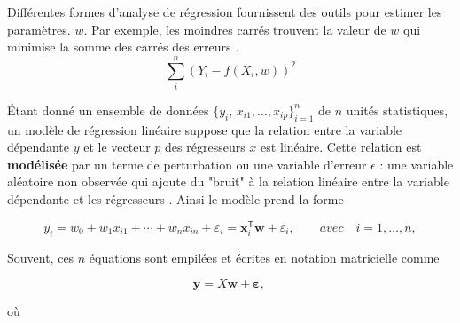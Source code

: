 	Différentes formes d'analyse de régression fournissent des outils pour estimer les paramètres. $w$. Par exemple, les moindres carrés trouvent la valeur de $w$ qui minimise la somme des carrés des erreurs \cite{deepa2021ai}. $${\sum _{i}^n (Y_{i}-f(X_{i},w ))^{2}}$$ 
	
	Étant donné un ensemble de données ${\displaystyle \{y_{i},\,x_{i1},\ldots ,x_{ip}\}_{i=1}^{n}}$ de $n$ unités statistiques, un modèle de régression linéaire suppose que la relation entre la variable dépendante $y$ et le vecteur $p$ des régresseurs $x$ est linéaire. Cette relation est \textbf{modélisée} par un terme de perturbation ou une variable d'erreur $\epsilon$ : une variable aléatoire non observée qui ajoute du "bruit" à la relation linéaire entre la variable dépendante et les régresseurs \cite{antoine2018apprentissage, darlington2016regression}. Ainsi le modèle prend la forme
	
	$${\displaystyle y_{i}=w _{0}+w _{1}x_{i1}+\cdots +w _{n}x_{in}+\varepsilon _{i}=\mathbf { x} _{i}^{\mathsf {T}}{\boldsymbol {w }}+\varepsilon_{i},\qquad avec \quad i=1,\ldots ,n,}
	$$
	
	Souvent, ces $n$ équations sont empilées et écrites en notation matricielle comme
	
	\begin{equation}\label{eq:regression_generale}
		{\displaystyle \mathbf {y} =X{\boldsymbol {w}}+{\boldsymbol {\varepsilon}},\,}
	\end{equation}
	

	
	où
	
